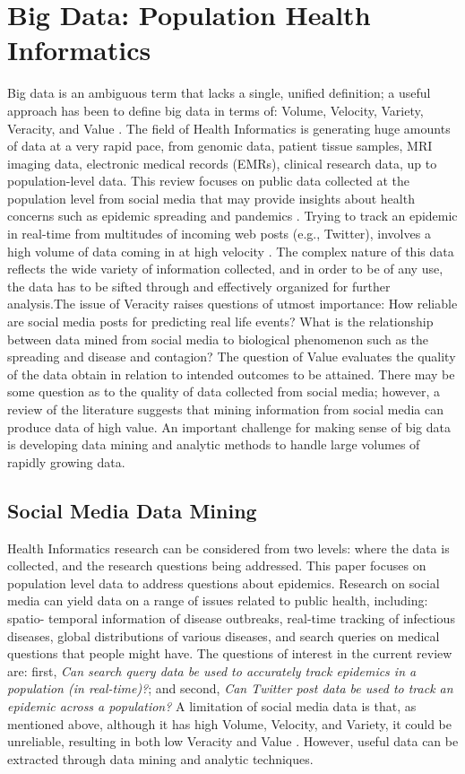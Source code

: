 \documentclass[sigconf]{acmart}
\begin{document}
\section{Big Data: Population Health Informatics}

Big data is an ambiguous term that lacks a single, unified definition; a useful 
approach has been to define big data in terms of: Volume, Velocity, Variety, 
Veracity, and Value \cite{demchenko12}. The field of Health Informatics is 
generating huge amounts of data at a very rapid pace, from genomic data, patient 
tissue samples, MRI imaging data, electronic medical records (EMRs), clinical
research data, up to population-level data. This review focuses on public data 
collected at the population level from social media that may provide insights about 
health concerns such as epidemic spreading and pandemics  \cite{hay13, herland14}. 
Trying to track an epidemic in real-time from multitudes of incoming web posts 
(e.g., Twitter), involves a high volume of data coming in at high velocity 
\cite{lamb13, paul14}. The complex nature of this data reflects the wide variety of 
information collected, and in order to be of any use, the data has to be sifted 
through and effectively organized for further analysis.The issue of Veracity raises 
questions of utmost importance: How reliable are social media posts for predicting 
real life events? What is the relationship between data mined from social media to 
biological phenomenon such as the spreading and disease and contagion? The question 
of Value evaluates the quality of the data obtain in relation to intended outcomes 
to be attained. There may be some question as to the quality of data collected from 
social media; however, a review of the literature suggests that mining information 
from social media can produce data of high value. An important challenge for making 
sense of big data is developing data mining and analytic methods to handle large 
volumes of rapidly growing data. 

\subsection{Social Media Data Mining}

Health Informatics research can be considered from two levels: where the data is 
collected, and the research questions being addressed. This paper focuses on 
population level data to address questions about epidemics. Research on social media 
can yield data on a range of issues related to public health, including: spatio-
temporal information of disease outbreaks, real-time tracking of infectious diseases, 
global distributions of various diseases, and search queries on medical questions
that people might have. The questions of interest in the current review are: first, 
\textit{Can search query data be used to accurately track epidemics in a population 
(in real-time)?};  and second, \textit{Can Twitter post data be used to track an 
epidemic across a population?} A limitation of social media data is that, as 
mentioned above, although it has high Volume, Velocity, and Variety, it could be 
unreliable, resulting in both low Veracity and Value \cite{hay14, lazer14}. 
However, useful data can be extracted through data mining and analytic techniques. 
\end{document}
